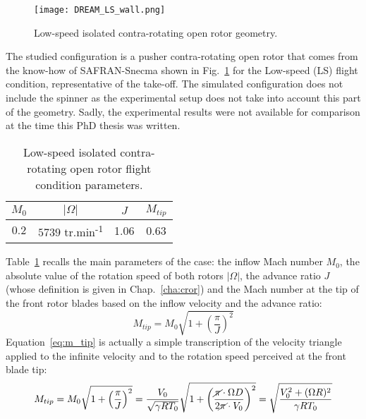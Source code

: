 

\begin{figure}[htp]
  \centering
  \texttt{[image: DREAM\_LS\_wall.png]}
  \caption{Low-speed isolated contra-rotating open rotor geometry.}
  \label{fig:dream_ls_wall}
\end{figure}

The studied configuration is a pusher contra-rotating open rotor
that comes from the know-how of SAFRAN-Snecma 
shown in Fig.~\ref{fig:dream_ls_wall} for the
Low-speed (LS) flight condition, representative of the take-off.
The simulated configuration does not include the spinner as the
experimental setup does not take into account this part of the geometry.
Sadly, the experimental results were not available for comparison
at the time this PhD thesis was written.

\begin{table}[htp]
   \centering
  \begin{tabular}{cccc}
    \toprule
    $M_0$ & $|\Omega|$ & $J$ & $M_{tip}$ \\
    \midrule
    $0.2$ & $5739$ tr.min\textsuperscript{-1} & 1.06 & 0.63 \\
    \bottomrule
  \end{tabular}
  \caption{Low-speed isolated contra-rotating open rotor flight condition parameters.}
  \label{tab:dream_ls_flight_condition}
\end{table} 
Table~\ref{tab:dream_ls_flight_condition} recalls the main
parameters of the case: the inflow Mach number $M_0$,
the absolute value of the rotation speed of both rotors $|\Omega|$,
the advance ratio $J$ (whose definition is given in Chap.~\ref{cha:cror})
and the Mach number at the tip of
the front rotor blades based on the inflow velocity and the advance ratio:
\begin{equation}
	M_{tip} = M_0 \sqrt{1 + \left(\frac{\pi}{J} \right)^2}
  \label{eq:m_tip}
\end{equation}
Equation~\ref{eq:m_tip} is actually a simple transcription of the velocity triangle
applied to the infinite velocity and to the rotation speed perceived
at the front blade tip:
\begin{equation}
    M_{tip} = M_0 \sqrt{1 + \left(\frac{\pi}{J}\right)^2} = 
    \frac{V_0}{\sqrt{\gamma R T_0}} \sqrt{1 + \left(\frac{
    	\cancel{\pi} \cdot \Omega D}{
    	2 \cancel{\pi} \cdot V_0}\right)^2} =
    \sqrt{\frac{V_0^2 + (\Omega R)^2}{\gamma R T_0}}
    \label{eq:m_tip_explained}
\end{equation}

